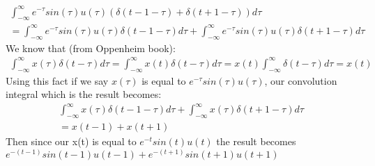 \documentclass[10pt,a4paper, margin=1in]{article}
\begin{document}
\begin{enumerate}
\begin{enumerate}
    \begin{gather*}
        \int_{-\infty}^\infty  e^{-\tau}sin(\tau)u(\tau)(\delta(t-1-\tau)+\delta(t+1-\tau))d\tau \\
        = \int_{-\infty}^\infty  e^{-\tau}sin(\tau)u(\tau)\delta(t-1-\tau)d\tau + \int_{-\infty}^\infty  e^{-\tau}sin(\tau)u(\tau)\delta(t+1-\tau)d\tau
    \end{gather*}
    We know that (from Oppenheim book): 
    \begin{gather*}
\int_{-\infty}^\infty  x(\tau)\delta(t-\tau)d\tau = \int_{-\infty}^\infty  x(t)\delta(t-\tau)d\tau = x(t)\int_{-\infty}^\infty  \delta(t-\tau)d\tau = x(t)
    \end{gather*}
    Using this fact if we say $x(\tau)$ is equal to $ e^{-\tau}sin(\tau)u(\tau)$, our convolution integral which is the result becomes:
    \begin{gather*}
        \int_{-\infty}^\infty  x(\tau)\delta(t-1-\tau)d\tau + \int_{-\infty}^\infty  x(\tau)\delta(t+1-\tau)d\tau \\
        = x(t-1)+x(t+1)
    \end{gather*}
    Then since our x(t) is equal to $ e^{-t}sin(t)u(t)$ the result becomes $ e^{-(t-1)}sin(t-1)u(t-1)+e^{-(t+1)}sin(t+1)u(t+1)$ \\
    \end{enumerate}


\end{enumerate}
\end{document}
